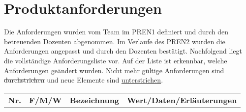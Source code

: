 \section{Produktanforderungen}

Die Anforderungen wurden vom Team im PREN1 definiert und durch den betreuenden Dozenten abgenommen. Im Verlaufe des PREN2 wurden die Anforderungen angepasst und durch den Dozenten bestätigt. Nachfolgend liegt die vollständige Anforderungsliste vor. Auf der Liste ist erkennbar, welche Anforderungen geändert wurden. Nicht mehr gültige Anforderungen sind \sout{durchstrichen} und neue Elemente sind \uline{unterstrichen}.

\renewcommand{\arraystretch}{1.5}
\begin{longtable}[l]{|l|c|l|p{8.5cm}|}
	\hline
	\textbf{Nr.} & \textbf{F/M/W} & \textbf{Bezeichnung} & \textbf{Wert/Daten/Erläuterungen} \endhead
	

\end{longtable}
